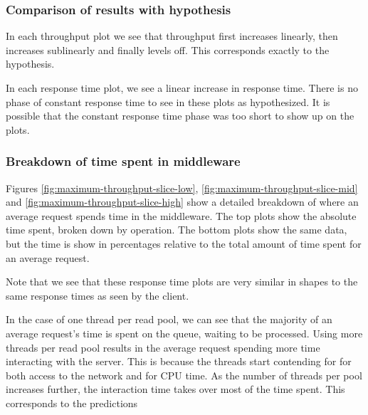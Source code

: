 \documentclass[11pt]{article}
\begin{document}
\subsubsection{Comparison of results with hypothesis}

In each throughput plot we see that throughput first increases linearly, then increases sublinearly and finally levels off.
This corresponds exactly to the hypothesis.

In each response time plot, we see a linear increase in response time.
There is no phase of constant response time to see in these plots as hypothesized.
It is possible that the constant response time phase was too short to show up on the plots.

\subsubsection{Breakdown of time spent in middleware}


Figures \ref{fig:maximum-throughput-slice-low}, \ref{fig:maximum-throughput-slice-mid} and \ref{fig:maximum-throughput-slice-high} show a detailed breakdown of where an average request spends time in the middleware.
The top plots show the absolute time spent, broken down by operation.
The bottom plots show the same data, but the time is show in percentages relative to the total amount of time spent for an average request.

Note that we see that these response time plots are very similar in shapes to the same response times as seen by the client.

In the case of one thread per read pool, we can see that the majority of an average request's time is spent on the queue, waiting to be processed.
Using more threads per read pool results in the average request spending more time interacting with the server.
This is because the threads start contending for for both access to the network and for CPU time.
As the number of threads per pool increases further, the interaction time takes over most of the time spent.
This corresponds to the predictions
\end{document}
